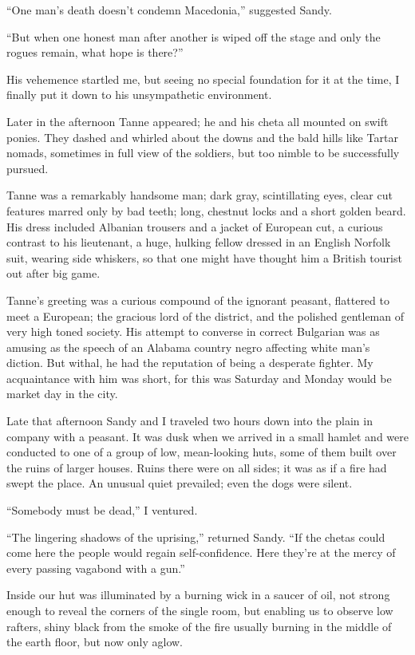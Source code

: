 \documentclass[a5paper,12pt]{book}
\begin{document}
“One man’s death doesn’t condemn Macedonia,” suggested Sandy.

“But when one honest man after another is wiped off the stage and only the rogues remain, what hope is there?”

His vehemence startled me, but seeing no special foundation for it at the time, I finally put it down to his unsympathetic environment.

Later in the afternoon Tanne appeared; he and his cheta all mounted on swift ponies. They dashed and whirled about the downs and the bald hills like Tartar nomads, sometimes in full view of the soldiers, but too nimble to be successfully pursued.

Tanne was a remarkably handsome man; dark gray, scintillating eyes, clear cut features marred only by bad teeth; long, chestnut locks and a short golden beard. His dress included Albanian trousers and a jacket of European cut, a curious contrast to his lieutenant, a huge, hulking fellow dressed in an English Norfolk suit, wearing side whiskers, so that one might have thought him a British tourist out after big game.

Tanne’s greeting was a curious compound of the ignorant peasant, flattered to meet a European; the gracious lord of the district, and the polished gentleman of very high toned society. His attempt to converse in correct Bulgarian was as amusing as the speech of an Alabama country negro affecting white man’s diction. But withal, he had the reputation of being a desperate fighter. My acquaintance with him was short, for this was Saturday and Monday would be market day in the city.

Late that afternoon Sandy and I traveled two hours down into the plain in company with a peasant. It was dusk when we arrived in a small hamlet and were conducted to one of a group of low, mean-looking huts, some of them built over the ruins of larger houses. Ruins there were on all sides; it was as if a fire had swept the place. An unusual quiet prevailed; even the dogs were silent.

“Somebody must be dead,” I ventured.

“The lingering shadows of the uprising,” returned Sandy. “If the chetas could come here the people would regain self-confidence. Here they’re at the mercy of every passing vagabond with a gun.”

Inside our hut was illuminated by a burning wick in a saucer of oil, not strong enough to reveal the corners of the single room, but enabling us to observe low rafters, shiny black from the smoke of the fire usually burning in the middle of the earth floor, but now only aglow.
\end{document}
